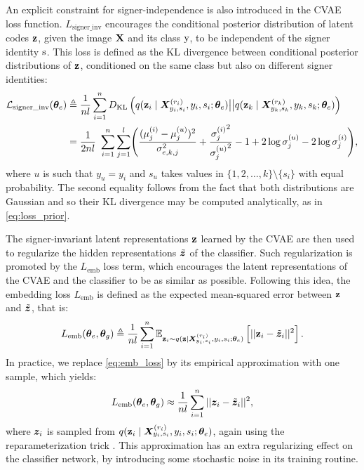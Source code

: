 An explicit constraint for signer-independence is also introduced in the CVAE loss function. $L_{\text{signer\_inv}}$ encourages the conditional posterior distribution of latent codes ${\mathbf{z}}$, given the image ${\mathbf{X}}$ and its class ${\textnormal{y}}$, to be independent of the signer identity ${\textnormal{s}}$. This loss is defined as the KL divergence between conditional posterior distributions of ${\mathbf{z}}$, conditioned on the same class but also on different signer identities:
\begin{align}
    \label{eq:loss_signer_inv}
    \mathcal{L}_{\text{signer\_inv}}({\bm{\theta}}_{e}) &\triangleq \frac{1}{nl} \sum_{i=1}^{n}D_{\mathrm{KL}}\left(q({\mathbf{z}}_{i} \mid {\bm{X}}^{(r_{i})}_{y_{i},s_{i}}, y_{i}, s_{i}; {\bm{\theta}}_e) \big| \big| q({\mathbf{z}}_{k} \mid {\bm{X}}^{(r_{k})}_{y_{k},s_{k}}, y_{k}, s_{k}; {\bm{\theta}}_e)\right) \nonumber\\
    &=\frac{1}{2nl}~\sum_{i=1}^{n}\sum_{j=1}^{l} \Biggl(\frac{(\mu^{(i)}_j - \mu^{(u)}_j)^2}{\sigma_{e,k,j}^2} + \frac{{\sigma^{(i)}_j}^2}{{\sigma^{(u)}_j}^2} -1 + 2\log {\sigma^{(u)}_j} - 2\log {\sigma^{(i)}_j} \Biggr),
\end{align}
where $u$ is such that $y_{u}=y_{i}$ and $s_u$ takes values in $\{1,2,\dots,k\} \setminus \lbrace s_i \rbrace$ with equal probability. The second equality follows from the fact that both distributions are Gaussian and so their KL divergence may be computed analytically, as in \eqref{eq:loss_prior}.

The signer-invariant latent representations ${\mathbf{z}}$ learned by the CVAE are then used to regularize the hidden representations $\tilde{{\bm{z}}}$ of the classifier. Such regularization is promoted by the $L_{\text{emb}}$ loss term, which encourages the latent representations of the CVAE and the classifier to be as similar as possible. Following this idea, the embedding loss $L_{\text{emb}}$ is defined as the expected mean-squared error between ${\mathbf{z}}$ and $\tilde{{\bm{z}}}$, that is:
\begin{equation}
    \label{eq:emb_loss}
    L_{\text{emb}}({\bm{\theta}}_e, {\bm{\theta}}_g) \triangleq \frac{1}{nl} \sum_{i=1}^{n} \mathbb{E}_{{\mathbf{z}}_{i} \sim q({\mathbf{z}} \mid {\bm{X}}^{(r_{i})}_{y_{i},s_{i}}, y_{i}, s_{i}; {\bm{\theta}}_e)} \left[ ||{\mathbf{z}}_i-\tilde{{\bm{z}}}_i||^2 \right].
\end{equation}
In practice, we replace \eqref{eq:emb_loss} by its empirical approximation with one sample, which yields:
\begin{equation}
    L_{\text{emb}}({\bm{\theta}}_e, {\bm{\theta}}_g) \approx \frac{1}{nl} \sum_{i=1}^{n}||{\bm{z}}_i-\tilde{{\bm{z}}}_i||^2,
\end{equation}
where ${\bm{z}}_i$ is sampled from $q({\mathbf{z}}_{i} \mid {\bm{X}}^{(r_{i})}_{y_{i},s_{i}}, y_{i}, s_{i}; {\bm{\theta}}_e)$, again using the reparameterization trick . This approximation has an extra regularizing effect on the classifier network, by introducing some stochastic noise in its training routine.

